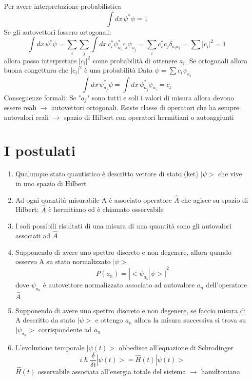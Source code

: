 \documentclass[a4paper,11pt]{report}
\theoremstyle{remark}
\theoremstyle{definition}
\begin{document}
Per avere interpretazione probabilistica 
\begin{equation*}
    \int dx \, \psi^*\psi = 1
\end{equation*}
Se gli autovettori fossero ortogonali:
\begin{equation*}
    \int dx \, \psi^*\psi = \sum_i \sum_j \int dx \, c_i^* \psi_{a_i}^*c_j\psi_{a_j} = \sum_i c_i^*c_j \delta_{a_ia_j}= \sum {|c_i|}^2 = 1
\end{equation*}
allora posso interpretare ${|c_i|}^2$ come probabilità di ottenere $a_i$. Se ortogonali allora buona congettura che ${|c_i|}^2$ è una probabilità \newline
Data $\psi = \sum c_i \psi_{a_i}$
\begin{equation*}
    \int dx \, \psi_{a_j}^*\psi = \int dx \, \psi_{a_j}^*\psi_{a_i} = c_j
\end{equation*}
Conseguenze formali: \newline
Se "$a_j$" sono tutti e soli i valori di misura allora devono essere reali $\rightarrow$ autovettori ortogonali. Esiste classe di operatori che ha sempre autovalori reali $\rightarrow$ spazio di Hilbert con operatori hermitiani o autoaggiunti

\section*{I postulati}
\begin{enumerate}
    \item Qualunque stato quantistico è descritto vettore di stato (ket) $|\psi>$ che vive in uno spazio di Hilbert
    \item Ad ogni quantità misurabile A è associato operatore $\hat{A}$ che agisce su spazio di Hilbert; $\hat{A}$ è hermitiano ed è chiamato osservabile
    \item I soli possibili risultati di una misura di una quantità sono gli autovalori associati ad $\hat{A}$ 
    \item Supponendo di avere uno spettro discreto e non degenere, allora quando osservo A su stato normalizzato $|\psi>$ 
    \begin{equation*}
        P(a_n) = {|<\psi_{a_n}|\psi>|}^2
    \end{equation*}
    dove $\psi_{a_n}$ è autovettore normalizzato associato ad autovalore $a_n$ dell'operatore $\hat{A}$ 
    \item Supponendo di avere uno spettro discreto e non degenere, se faccio misura di A descritto da stato $|\psi>$ e ottengo $a_n$ allora la misura successiva si trova su $|\psi_{a_n}>$ corrispondente ad $a_n$
    \item L'evoluzione temporale $|\psi(t)>$ obbedisce all'equazione di Schrodinger
    \begin{equation*}
        i\hslash \frac{\delta}{\delta t}|\psi(t)> = \hat{H}(t)|\psi(t)>
    \end{equation*}
    $\hat{H}(t)$ osservabile associata all'energia totale del sistema $\rightarrow$ hamiltoniana
\end{enumerate}
\end{document}
